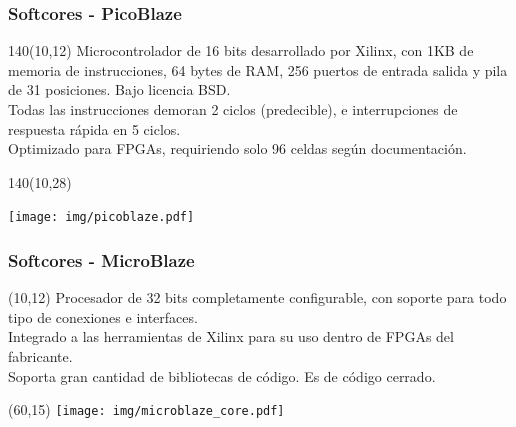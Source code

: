 \documentclass[aspectratio=169]{beamer}
\begin{document}
\begin{frame}[t,fragile]
    \frametitle{Softcores - PicoBlaze}
    \begin{textblock}{140}(10,12) \footnotesize
    Microcontrolador de 16 bits desarrollado por Xilinx, con 1KB de memoria de instrucciones, 64 bytes de RAM, 256 puertos de entrada salida y pila de 31 posiciones. Bajo licencia BSD.\\
    \textcolor{verdeuca}{Todas las instrucciones demoran 2 ciclos (predecible), e interrupciones de respuesta rápida en 5 ciclos.}\\
    Optimizado para FPGAs, requiriendo solo 96 celdas según documentación.
    \end{textblock}
    \begin{textblock}{140}(10,28)
    \begin{center}
    \texttt{[image: img/picoblaze.pdf]}
    \end{center}
    \end{textblock}
\end{frame}

\begin{frame}[t,fragile]
    \frametitle{Softcores - MicroBlaze}
    \begin{textblock}{50}(10,12) \footnotesize
    Procesador de 32 bits completamente configurable, con soporte para todo tipo de conexiones e interfaces.\\
    \bigskip
    Integrado a las herramientas de Xilinx para su uso dentro de FPGAs del fabricante.\\
    \bigskip
    Soporta gran cantidad de bibliotecas de código. Es de código cerrado.
    \end{textblock}
    \begin{textblock}{10}(60,15)
    \texttt{[image: img/microblaze\_core.pdf]}
    \end{textblock}
    
\end{frame}
    
\end{document}
